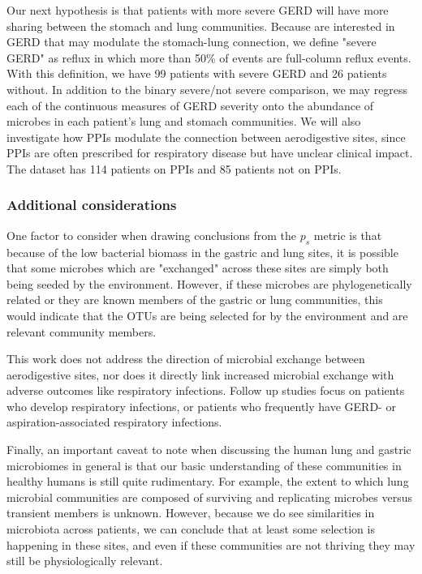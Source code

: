 \documentclass[12pt]{article}
\begin{document}
Our next hypothesis is that patients with more severe GERD will have 
more sharing between the stomach and lung communities. Because are 
interested in GERD that may modulate the stomach-lung connection, we 
define "severe GERD" as reflux in which more than 50\% of events are 
full-column reflux events. With this definition, we have 99 patients 
with severe GERD and 26 patients without. In addition to the binary 
severe/not severe comparison, we may regress each of the continuous 
measures of GERD severity onto the abundance of microbes in each 
patient's lung and stomach communities. We will also investigate how 
PPIs modulate the connection between aerodigestive sites, since PPIs 
are often prescribed for respiratory disease but have unclear clinical 
impact. The dataset has 114 patients on PPIs and 85 patients not on 
PPIs.

\subsubsection{Additional considerations}
One factor to consider when drawing conclusions from the $p_s$ metric 
is that because of the low bacterial biomass in the gastric and lung 
sites, it is possible that some microbes which are "exchanged" across 
these sites are simply both being seeded by the environment. However, 
if these microbes are phylogenetically related or they are known 
members of the gastric or lung communities, this would indicate that 
the OTUs are being selected for by the environment and are relevant 
community members.

This work does not address the direction of microbial exchange between 
aerodigestive sites, nor does it directly link increased microbial 
exchange with adverse outcomes like respiratory infections. Follow up 
studies focus on patients who develop respiratory infections, or 
patients who frequently have GERD- or aspiration-associated 
respiratory infections. 


Finally, an important caveat to note when discussing the human lung 
and gastric microbiomes in general is that our basic understanding of 
these communities in healthy humans is still quite rudimentary. For 
example, the extent to which lung microbial communities are composed 
of surviving and replicating microbes versus transient members is 
unknown. However, because we do see similarities in microbiota across 
patients, we can conclude that at least some selection is happening in 
these sites, and even if these communities are not thriving they may 
still be physiologically relevant.
\end{document}
